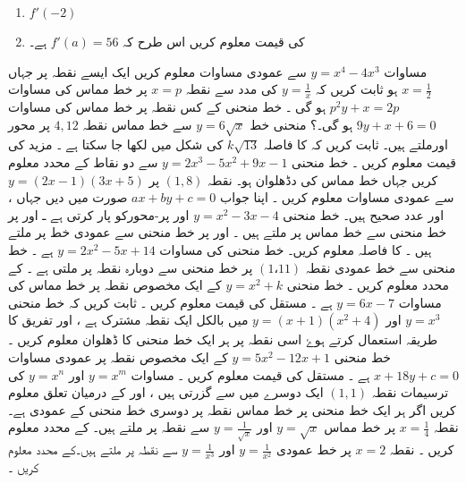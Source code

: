 \begin{enumerate}[.a]
\item \(f'(-2)\)
\item 
  کی قیمت معلوم کریں اس طرح کہ \(f'(a)=56\) ہے۔
\end{enumerate}
 مساوات \(y=x^4-4x^3\) سے عمودی مساوات معلوم کریں ایک ایسے نقطہ پر جہاں \(x=\frac{1}{2}\) ہو
  ثابت کریں کہ \(y=\frac{1}{x}\) کی مدد سے نقطہ \(x=p\) پر خط مماس کی مساوات \(p^2y+x=2p\) ہو گی ۔  خط منحنی کے کس نقطہ پر خط مماس کی مساوات \(9y+x+6=0\) ہو گی۔؟
 منحنی خط \(y=6 \sqrt{x}\)  سے خط مماس نقطہ \( 4,12\)  پر محور اورملتے ہیں۔ ثابت کریں کہ کا فاصلہ \(k \sqrt{13}\) کی شکل میں لکھا جا سکتا ہے ۔ مزید  کی قیمت معلوم کریں ۔
   خط منحنی \(y=2x^3-5x^2+9x-1\)  سے دو نقاط کے محدد معلوم کریں جہاں خط مماس کی دڈھلوان  ہو۔
 نقطہ \( ( 1,8) \) پر \(y=(2x-1)(3x+5)\) سے عمودی مساوات معلوم کریں ۔ اپنا جواب \(ax+by+c=0\) صورت میں دیں جہاں ،  اور عدد صحیح ہیں۔
 خط منحنی \(y=x^2-3x-4\) اور  پر-محورکو پار کرتی ہے ـ  اور  پر خط منحنی سے خط مماس پر ملتے ہیں ۔  اور   پر خط منحنی سے عمودی خط  پر ملتے ہیں ۔  کا فاصلہ معلوم کریں۔
 خط منحنی کی مساوات \(y=2x^2-5x+14\) ہے ۔ خط منحنی سے خط عمودی نقطہ \( (1،11)  \) پر خط منحنی سے دوبارہ نقطہ پر ملتی ہے ۔ کے محدد معلوم کریں ۔
  خط منحنی \(y=x^2+k\) کے ایک مخصوص نقطہ پر خط مماس کی مساوات \(y=6x-7\) ہے ۔ مستقل  کی قیمت معلوم کریں ۔
  ثابت کریں کہ خط منحنی  \(y=x^3\) اور \(y=(x+1)(x^2+4)\) میں بالکل ایک نقطہ مشترک ہے ، اور تفریق کا طریقہ استعمال کرتے ہوۓ اسی نقطہ پر ہر ایک خط منحنی کا ڈھلوان معلوم کریں ۔
   خط منحنی \(y=5x^2-12x+1\) کے ایک مخصوص نقطہ پر عمودی مساوات \(x+18y+c=0\) ہے ۔ مستقل  کی قیمت معلوم کریں ۔
 مساوات \(y=x^m\) اور \(y=x^n\) کی ترسیمات نقطہ \( (1,1)  \) ایک دوسرے میں سے گزرتی ہیں ، اور کے درمیان تعلق معلوم کریں اگر ہر ایک خط منحنی پر خط مماس نقطہ   پر دوسری خط منحنی کے عمودی ہے۔
 نقطہ \(x= \frac{1}{4}\)  پر خط مماس \(y= \sqrt{x}\) اور  \(y= \frac{1}{\sqrt{x}}\) سے نقطہ  پر ملتے ہیں۔ کے محدد معلوم کریں ۔
 نقطہ \(x=2\) پر خط عمودی \(y=\frac{1}{x^2}\) اور \(y=\frac{1}{x^3}\)  سے  نقطہ  پر ملتے ہیں۔کے محدد معلوم کریں ۔
